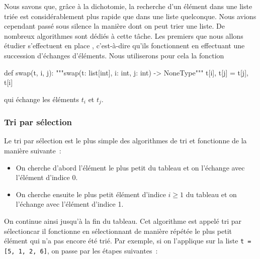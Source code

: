 \documentclass{magnolia}
\begin{document}
\vspace{2ex}
Nous savons que, grâce à la dichotomie, la recherche d'un élément dans une liste triée est
considérablement plus rapide que dans une liste quelconque. Nous avions cependant passé sous silence la manière dont
on peut trier une liste. De nombreux algorithmes sont dédiés à cette tâche. Les premiers que nous allons étudier
s'effectuent \og en place \fg, c'est-à-dire qu'ils fonctionnent en effectuant une succession d'échanges d'éléments.
Nous utiliserons pour cela la fonction
\begin{pythoncode}
def swap(t, i, j):
    """swap(t: list[int], i: int, j: int) -> NoneType"""
    t[i], t[j] = t[j], t[i]
\end{pythoncode}
\noindent
qui échange les éléments $t_i$ et $t_j$.

\subsubsection{Tri par sélection}

Le tri par sélection est le plus simple des algorithmes de tri et fonctionne de
la manière suivante~:
\begin{itemize}
\item On cherche d'abord l'élément le plus petit du tableau et on l'échange avec
  l'élément d'indice 0.
\item On cherche ensuite le plus petit élément d'indice $i\geq 1$ du tableau et
  on l'échange avec l'élément d'indice 1.
\end{itemize}
On continue ainsi jusqu'à la fin du tableau. Cet algorithme
est appelé \og tri par sélection\fg car il fonctionne en sélectionnant de
manière répétée le plus petit élément qui n'a pas encore été trié. Par exemple,
si on l'applique sur la liste \verb!t = [5, 1, 2, 6]!, on passe par les étapes
suivantes~: 
\end{document}
